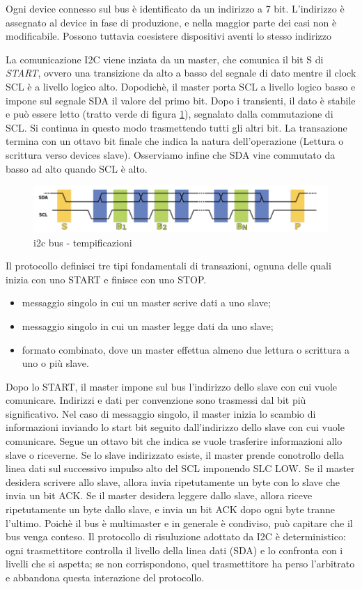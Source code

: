 Ogni device connesso sul bus è identificato da un indirizzo a 7 bit. L'indirizzo è assegnato al device in fase di produzione, e nella maggior parte dei casi non è modificabile. Possono tuttavia coesistere dispositivi aventi lo stesso indirizzo 

La comunicazione I2C viene inziata da un master, che comunica il bit S di \textit{START}, ovvero una transizione da alto a basso del segnale di dato mentre il clock SCL è a livello logico alto. Dopodichè, il master porta SCL a livello logico basso e impone sul segnale SDA il valore del primo bit. Dopo i transienti, il dato è stabile e può essere letto (tratto verde di figura \ref{img:i2c_logic_2}), segnalato dalla commutazione di SCL. Si continua in questo modo trasmettendo tutti gli altri bit. La transazione termina con un ottavo bit finale che indica la natura dell'operazione (Lettura o scrittura verso devices slave). Osserviamo infine che SDA vine commutato da basso ad alto quando SCL è alto. 

\begin{figure}[ht]
    \centering
    \includegraphics[width=.7\textwidth]{img/i2c_2.png}
    \caption{i2c bus - tempificazioni}
    \label{img:i2c_logic_2}
\end{figure}

Il protocollo definisci tre tipi fondamentali di transazioni, ognuna delle quali inizia con uno START e finisce con uno STOP.
\begin{itemize}
    \item messaggio singolo in cui un master scrive dati a uno slave;
    \item messaggio singolo in cui un master legge dati da uno slave;
    \item formato combinato, dove un master effettua almeno due lettura o scrittura a uno o più slave.
\end{itemize}

Dopo lo START, il master impone sul bus l'indirizzo dello slave con cui vuole comunicare. Indirizzi e dati per convenzione sono trasmessi dal bit più significativo. 
Nel caso di messaggio singolo, il master inizia lo scambio di informazioni inviando lo start bit seguito dall'indirizzo dello slave con cui vuole comunicare. Segue un ottavo bit che indica se vuole trasferire informazioni allo slave o riceverne. Se lo slave indirizzato esiste, il master prende conotrollo della linea dati sul successivo impulso alto del SCL imponendo SLC LOW. 
Se il master desidera scrivere allo slave, allora invia ripetutamente un byte con lo slave che invia un bit ACK. Se il master desidera leggere dallo slave, allora riceve ripetutamente un byte dallo slave, e invia un bit ACK dopo ogni byte tranne l'ultimo. 
Poichè il bus è multimaster e in generale è condiviso, può capitare che il bus venga conteso. Il protocollo di risuluzione adottato da I2C è deterministico: ogni trasmettitore controlla il livello della linea dati (SDA) e lo confronta con i livelli che si aspetta; se non corrispondono, quel trasmettitore ha perso l'arbitrato e abbandona questa interazione del protocollo. 


